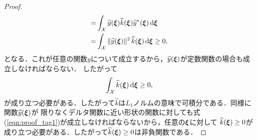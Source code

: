 \begin{proof}
\begin{align}
        =& \int_{\mathcal{X}} \widehat{y}(\boldsymbol{\xi}) \widehat{k}(\boldsymbol{\xi}) \widehat{y}^*(\boldsymbol{\xi}) \, \mathrm{d}\boldsymbol{\xi} \\
        =& \int_{\mathcal{X}} \| \widehat{y}(\boldsymbol{\xi}) \|^2 \, \widehat{k}(\boldsymbol{\xi}) \, \mathrm{d}\boldsymbol{\xi} \geq 0,
    \end{align}
    となる．これが任意の関数$y$について成立するから，$\widehat{y}(\boldsymbol{\xi})$が定数関数の場合も成立しなければならない．
    したがって
    \begin{equation}
        \int_{\mathcal{X}} \widehat{k}(\boldsymbol{\xi}) \, \mathrm{d}\boldsymbol{\xi} \geq 0,
    \end{equation}
    が成り立つ必要がある．したがって$\widehat{k}$は$L_1$ノルムの意味で可積分である．同様に関数$\widehat{y}(\boldsymbol{\xi})$が
    限りなくデルタ関数に近い形状の関数に対しても式(\ref{eqn:proof_tag1})が成立しなければならないから，任意の$\boldsymbol{\xi}$に対して
    $\widehat{k}(\boldsymbol{\xi}) \geq 0$が成り立つ必要がある．したがって$\widehat{k}(\boldsymbol{\xi}) \geq 0$は非負関数である．
\end{proof}

